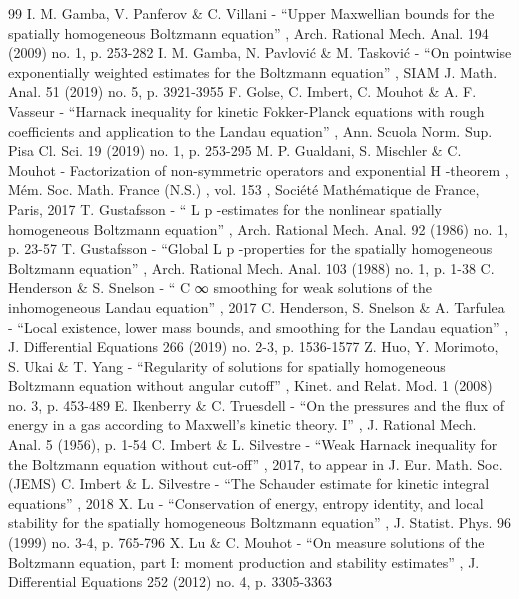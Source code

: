 \documentclass[11pt]{article}
\theoremstyle{plain}
\theoremstyle{definition}
\numberwithin{equation}{section}
\begin{document}
\begin{thebibliography}{99}
 I. M. Gamba, V. Panferov \& C. Villani - “Upper Maxwellian bounds for the spatially homogeneous Boltzmann equation” , Arch. Rational Mech. Anal. 194 (2009) no. 1, p. 253-282
 I. M. Gamba, N. Pavlović \& M. Tasković - “On pointwise exponentially weighted estimates for the Boltzmann equation” , SIAM J. Math. Anal. 51 (2019) no. 5, p. 3921-3955
 F. Golse, C. Imbert, C. Mouhot \& A. F. Vasseur - “Harnack inequality for kinetic Fokker-Planck equations with rough coefficients and application to the Landau equation” , Ann. Scuola Norm. Sup. Pisa Cl. Sci. 19 (2019) no. 1, p. 253-295
 M. P. Gualdani, S. Mischler \& C. Mouhot - Factorization of non-symmetric operators and exponential H -theorem , Mém. Soc. Math. France (N.S.) , vol. 153 , Société Mathématique de France, Paris, 2017
 T. Gustafsson - “ L p -estimates for the nonlinear spatially homogeneous Boltzmann equation” , Arch. Rational Mech. Anal. 92 (1986) no. 1, p. 23-57
 T. Gustafsson - “Global L p -properties for the spatially homogeneous Boltzmann equation” , Arch. Rational Mech. Anal. 103 (1988) no. 1, p. 1-38
 C. Henderson \& S. Snelson - “ C ∞ smoothing for weak solutions of the inhomogeneous Landau equation” , 2017
 C. Henderson, S. Snelson \& A. Tarfulea - “Local existence, lower mass bounds, and smoothing for the Landau equation” , J. Differential Equations 266 (2019) no. 2-3, p. 1536-1577
 Z. Huo, Y. Morimoto, S. Ukai \& T. Yang - “Regularity of solutions for spatially homogeneous Boltzmann equation without angular cutoff” , Kinet. and Relat. Mod. 1 (2008) no. 3, p. 453-489
 E. Ikenberry \& C. Truesdell - “On the pressures and the flux of energy in a gas according to Maxwell’s kinetic theory. I” , J. Rational Mech. Anal. 5 (1956), p. 1-54
 C. Imbert \& L. Silvestre - “Weak Harnack inequality for the Boltzmann equation without cut-off” , 2017, to appear in J. Eur. Math. Soc. (JEMS)
 C. Imbert \& L. Silvestre - “The Schauder estimate for kinetic integral equations” , 2018
 X. Lu - “Conservation of energy, entropy identity, and local stability for the spatially homogeneous Boltzmann equation” , J. Statist. Phys. 96 (1999) no. 3-4, p. 765-796
 X. Lu \& C. Mouhot - “On measure solutions of the Boltzmann equation, part I: moment production and stability estimates” , J. Differential Equations 252 (2012) no. 4, p. 3305-3363

\end{thebibliography}
\end{document}

